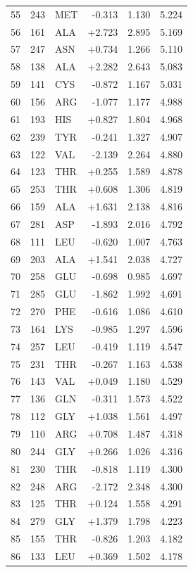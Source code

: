 \begin{longtable}{r l l r r r}
55 & 243 & MET & -0.313 & 1.130 & 5.224 \\
56 & 161 & ALA & +2.723 & 2.895 & 5.169 \\
57 & 247 & ASN & +0.734 & 1.266 & 5.110 \\
58 & 138 & ALA & +2.282 & 2.643 & 5.083 \\
59 & 141 & CYS & -0.872 & 1.167 & 5.031 \\
60 & 156 & ARG & -1.077 & 1.177 & 4.988 \\
61 & 193 & HIS & +0.827 & 1.804 & 4.968 \\
62 & 239 & TYR & -0.241 & 1.327 & 4.907 \\
63 & 122 & VAL & -2.139 & 2.264 & 4.880 \\
64 & 123 & THR & +0.255 & 1.589 & 4.878 \\
65 & 253 & THR & +0.608 & 1.306 & 4.819 \\
66 & 159 & ALA & +1.631 & 2.138 & 4.816 \\
67 & 281 & ASP & -1.893 & 2.016 & 4.792 \\
68 & 111 & LEU & -0.620 & 1.007 & 4.763 \\
69 & 203 & ALA & +1.541 & 2.038 & 4.727 \\
70 & 258 & GLU & -0.698 & 0.985 & 4.697 \\
71 & 285 & GLU & -1.862 & 1.992 & 4.691 \\
72 & 270 & PHE & -0.616 & 1.086 & 4.610 \\
73 & 164 & LYS & -0.985 & 1.297 & 4.596 \\
74 & 257 & LEU & -0.419 & 1.119 & 4.547 \\
75 & 231 & THR & -0.267 & 1.163 & 4.538 \\
76 & 143 & VAL & +0.049 & 1.180 & 4.529 \\
77 & 136 & GLN & -0.311 & 1.573 & 4.522 \\
78 & 112 & GLY & +1.038 & 1.561 & 4.497 \\
79 & 110 & ARG & +0.708 & 1.487 & 4.318 \\
80 & 244 & GLY & +0.266 & 1.026 & 4.316 \\
81 & 230 & THR & -0.818 & 1.119 & 4.300 \\
82 & 248 & ARG & -2.172 & 2.348 & 4.300 \\
83 & 125 & THR & +0.124 & 1.558 & 4.291 \\
84 & 279 & GLY & +1.379 & 1.798 & 4.223 \\
85 & 155 & THR & -0.826 & 1.203 & 4.182 \\
86 & 133 & LEU & +0.369 & 1.502 & 4.178 \\

\end{longtable}

